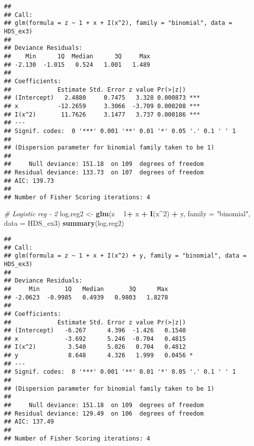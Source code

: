 \documentclass[]{article}
\newenvironment{Shaded}{\begin{snugshade}}{\end{snugshade}}
\newcommand{\CommentTok}[1]{\textcolor[rgb]{0.56,0.35,0.01}{\textit{#1}}}
\newcommand{\DataTypeTok}[1]{\textcolor[rgb]{0.13,0.29,0.53}{#1}}
\newcommand{\DecValTok}[1]{\textcolor[rgb]{0.00,0.00,0.81}{#1}}
\newcommand{\KeywordTok}[1]{\textcolor[rgb]{0.13,0.29,0.53}{\textbf{#1}}}
\newcommand{\NormalTok}[1]{#1}
\newcommand{\OperatorTok}[1]{\textcolor[rgb]{0.81,0.36,0.00}{\textbf{#1}}}
\newcommand{\StringTok}[1]{\textcolor[rgb]{0.31,0.60,0.02}{#1}}
\begin{document}
\begin{verbatim}
## 
## Call:
## glm(formula = z ~ 1 + x + I(x^2), family = "binomial", data = HDS_ex3)
## 
## Deviance Residuals: 
##    Min      1Q  Median      3Q     Max  
## -2.130  -1.015   0.524   1.001   1.489  
## 
## Coefficients:
##             Estimate Std. Error z value Pr(>|z|)    
## (Intercept)   2.4880     0.7475   3.328 0.000873 ***
## x           -12.2659     3.3066  -3.709 0.000208 ***
## I(x^2)       11.7626     3.1477   3.737 0.000186 ***
## ---
## Signif. codes:  0 '***' 0.001 '**' 0.01 '*' 0.05 '.' 0.1 ' ' 1
## 
## (Dispersion parameter for binomial family taken to be 1)
## 
##     Null deviance: 151.18  on 109  degrees of freedom
## Residual deviance: 133.73  on 107  degrees of freedom
## AIC: 139.73
## 
## Number of Fisher Scoring iterations: 4
\end{verbatim}

\begin{Shaded}
\begin{Highlighting}[]
\CommentTok{# Logistic reg - 2}
\NormalTok{log.reg2 <-}\StringTok{ }\KeywordTok{glm}\NormalTok{(z }\OperatorTok{~}\StringTok{ }\DecValTok{1}\OperatorTok{+}\StringTok{ }\NormalTok{x }\OperatorTok{+}\StringTok{ }\KeywordTok{I}\NormalTok{(x}\OperatorTok{^}\DecValTok{2}\NormalTok{) }\OperatorTok{+}\StringTok{ }\NormalTok{y, }\DataTypeTok{family =} \StringTok{"binomial"}\NormalTok{, }\DataTypeTok{data =}\NormalTok{ HDS_ex3)}
\KeywordTok{summary}\NormalTok{(log.reg2)}
\end{Highlighting}
\end{Shaded}

\begin{verbatim}
## 
## Call:
## glm(formula = z ~ 1 + x + I(x^2) + y, family = "binomial", data = HDS_ex3)
## 
## Deviance Residuals: 
##     Min       1Q   Median       3Q      Max  
## -2.0623  -0.9985   0.4939   0.9803   1.8278  
## 
## Coefficients:
##             Estimate Std. Error z value Pr(>|z|)  
## (Intercept)   -6.267      4.396  -1.426   0.1540  
## x             -3.692      5.246  -0.704   0.4815  
## I(x^2)         3.540      5.026   0.704   0.4812  
## y              8.648      4.326   1.999   0.0456 *
## ---
## Signif. codes:  0 '***' 0.001 '**' 0.01 '*' 0.05 '.' 0.1 ' ' 1
## 
## (Dispersion parameter for binomial family taken to be 1)
## 
##     Null deviance: 151.18  on 109  degrees of freedom
## Residual deviance: 129.49  on 106  degrees of freedom
## AIC: 137.49
## 
## Number of Fisher Scoring iterations: 4
\end{verbatim}
\end{document}
